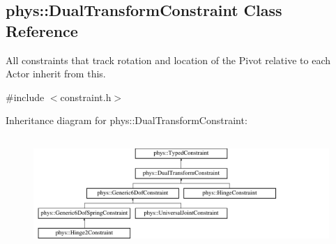 \hypertarget{classphys_1_1DualTransformConstraint}{
\subsection{phys::DualTransformConstraint Class Reference}
\label{classphys_1_1DualTransformConstraint}
}


All constraints that track rotation and location of the Pivot relative to each Actor inherit from this.  




{\ttfamily \#include $<$constraint.h$>$}

Inheritance diagram for phys::DualTransformConstraint:\begin{figure}[H]
\begin{center}
\leavevmode
\includegraphics[height=4.261796cm]{classphys_1_1DualTransformConstraint}
\end{center}
\end{figure}
